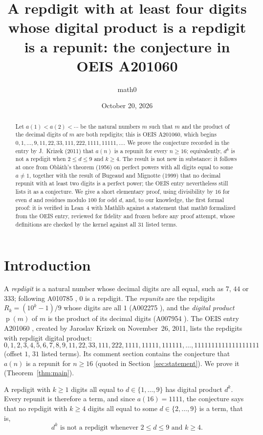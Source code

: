 \documentclass[11pt]{amsart}
\title[Repdigits with repdigit digital product (OEIS A201060)]{A repdigit with at least four digits whose digital product is a repdigit is a repunit: the conjecture in OEIS A201060}
\author{math0}
\date{October 20, 2026}
\theoremstyle{plain}
\theoremstyle{definition}
\newcommand{\dprod}{\operatorname{p}}
\begin{document}
\begin{abstract}
Let $a(1)<a(2)<\cdots$ be the natural numbers $m$ such that $m$ and the product of the decimal digits of $m$ are both repdigits; this is OEIS A201060, which begins $0,1,\dots,9,11,22,33,111,222,1111,11111,\dots$.
We prove the conjecture recorded in the entry by J.~Krizek (2011) that $a(n)$ is a repunit for every $n\ge16$; equivalently, $d^k$ is not a repdigit when $2\le d\le9$ and $k\ge4$.
The result is not new in substance: it follows at once from Obl\'ath's theorem (1956) on perfect powers with all digits equal to some $a\ne1$, together with the result of Bugeaud and Mignotte (1999) that no decimal repunit with at least two digits is a perfect power; the OEIS entry nevertheless still lists it as a conjecture.
We give a short elementary proof, using divisibility by $16$ for even $d$ and residues modulo $100$ for odd $d$, and, to our knowledge, the first formal proof: it is verified in Lean~4 with Mathlib against a statement that math0 formalized from the OEIS entry, reviewed for fidelity and frozen before any proof attempt, whose definitions are checked by the kernel against all $31$ listed terms.
\end{abstract}
\maketitle

\section{Introduction}

A \emph{repdigit} is a natural number whose decimal digits are all equal, such as $7$, $44$ or $333$; following A010785 \cite{A010785}, $0$ is a repdigit. The \emph{repunits} are the repdigits $R_k=(10^k-1)/9$ whose digits are all $1$ (A002275 \cite{A002275}), and the \emph{digital product} $\dprod(m)$ of $m$ is the product of its decimal digits (A007954 \cite{A007954}).
The OEIS entry A201060 \cite{A201060}, created by Jaroslav Krizek on November~26, 2011, lists the repdigits with repdigit digital product:
\[
0,1,2,3,4,5,6,7,8,9,11,22,33,111,222,1111,11111,111111,\dots,1111111111111111111
\]
(offset $1$, $31$ listed terms). Its comment section contains the conjecture that $a(n)$ is a repunit for $n\ge16$ (quoted in Section~\ref{sec:statement}). We prove it (Theorem~\ref{thm:main}).

A repdigit with $k\ge1$ digits all equal to $d\in\{1,\dots,9\}$ has digital product $d^k$. Every repunit is therefore a term, and since $a(16)=1111$, the conjecture says that no repdigit with $k\ge4$ digits all equal to some $d\in\{2,\dots,9\}$ is a term, that is,
\begin{equation}\label{eq:reform}
  d^k \text{ is not a repdigit whenever } 2\le d\le 9 \text{ and } k\ge 4 .
\end{equation}
\end{document}
